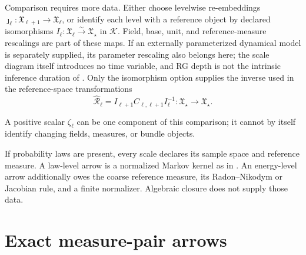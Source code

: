 Comparison requires more data. Either choose levelwise re-embeddings
\(\jmath_\ell:\mathfrak X_{\ell+1}\to\mathfrak X_\ell\), or identify each
level with a reference object by declared isomorphisms
\(I_\ell:\mathfrak X_\ell\xrightarrow{\sim}\mathfrak X_\star\) in
\(\mathscr K\).
Field, base, unit, and reference-measure rescalings are part of these maps.
If an externally parameterized dynamical model is separately supplied, its
parameter rescaling also belongs here; the scale diagram itself introduces no
time variable, and RG depth is not the intrinsic inference duration of
. Only the isomorphism option supplies the inverse used in the
reference-space transformations
\begin{equation}
\widehat{\mathcal R}_\ell
=I_{\ell+1}C_{\ell,\ell+1}I_\ell^{-1}:
\mathfrak X_\star\longrightarrow\mathfrak X_\star.
\label{eq:rg-reference-cocycle}
\end{equation}

A positive scalar \(\zeta_\ell\) can be one component of this comparison; it
cannot by itself identify changing fields, measures, or bundle objects.

If probability laws are present, every scale declares its sample space and
reference measure. A law-level arrow is a normalized Markov kernel as in
. An energy-level arrow additionally owes the
coarse reference measure, its Radon--Nikodym or Jacobian rule, and a finite
normalizer. Algebraic closure does not supply those data. 

\section{Exact measure-pair arrows}
\label{sec:rg-measure-pair-arrows}

